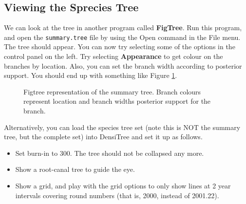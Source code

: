 \documentclass{article}
\begin{document}
\subsection*{Viewing the Sprecies Tree}

We can look at the tree in another program called {\bf FigTree}. Run this program, and open
the \texttt{summary.tree} file by using the Open command in the File menu. The tree should appear.
You can now try selecting some of the options in the control panel on the left. Try selecting
{\bf Appearance} to get colour on the branches by location. Also, you can set the branch width
according to posterior support. You should end up with something like Figure \ref{fig.figtree}.

\begin{figure}
\begin{center}


\end{center}
\caption{\label{fig.figtree} Figtree representation of the summary tree. Branch colours represent location
and branch widths posterior support for the branch.}
\end{figure}


Alternatively, you can load the species tree set (note this is NOT the summary tree, but the complete set) into DensiTree and set it up as follows.

\begin{itemize}
\item Set burn-in to 300. The tree should not be collapsed any more.
\item Show a root-canal tree to guide the eye. 
\item Show a grid, and play with the grid options to only show lines at 2 year intervals covering round numbers (that is, 2000, instead of 2001.22).
\end{itemize}
\end{document}
